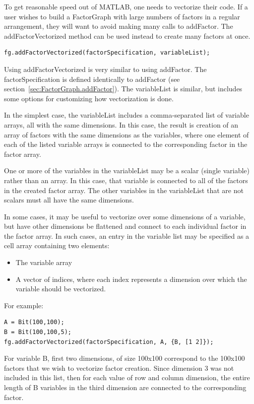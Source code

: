 To get reasonable speed out of MATLAB, one needs to vectorize their code.  If a user wishes to build a FactorGraph with large numbers of factors in a regular arrangement, they will want to avoid making many calls to addFactor.  The addFactorVectorized method can be used instead to create many factors at once.

\begin{lstlisting}
fg.addFactorVectorized(factorSpecification, variableList);
\end{lstlisting}

Using addFactorVectorized is very similar to using addFactor.  The factorSpecification is defined identically to addFactor (see section~\ref{sec:FactorGraph.addFactor}). The variableList is similar, but includes some options for customizing how vectorization is done.

In the simplest case, the variableList includes a comma-separated list of variable arrays, all with the same dimensions.  In this case, the result is creation of an array of factors with the same dimensions as the variables, where one element of each of the listed variable arrays is connected to the corresponding factor in the factor array.

One or more of the variables in the variableList may be a scalar (single variable) rather than an array.  In this case, that variable is connected to all of the factors in the created factor array.  The other variables in the variableList that are not scalars must all have the same dimensions.

In some cases, it may be useful to vectorize over some dimensions of a variable, but have other dimensions be flattened and connect to each individual factor in the factor array.  In such cases, an entry in the variable list may be specified as a cell array containing two elements:

\begin{itemize}
\item The variable array
\item A vector of indices, where each index represents a dimension over which the variable should be vectorized.
\end{itemize}

For example:
\begin{lstlisting}
A = Bit(100,100);
B = Bit(100,100,5);
fg.addFactorVectorized(factorSpecification, A, {B, [1 2]});
\end{lstlisting}

For variable B, first two dimensions, of size 100x100 correspond to the 100x100 factors that we wish to vectorize factor creation.  Since dimension 3 was not included in this list, then for each value of row and column dimension, the entire length of B variables in the third dimension are connected to the corresponding factor.

